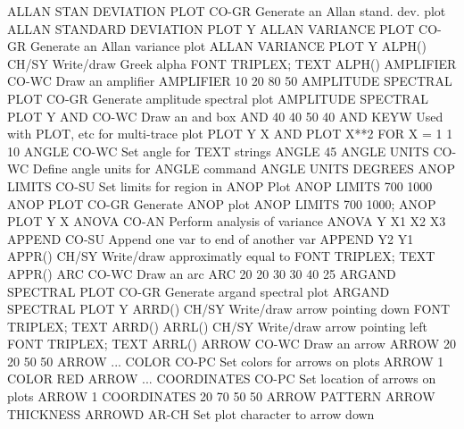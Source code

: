 ALLAN STAN DEVIATION PLOT   CO-GR Generate an Allan stand. dev. plot
                                  ALLAN STANDARD DEVIATION PLOT Y
ALLAN VARIANCE PLOT         CO-GR Generate an Allan variance plot
                                  ALLAN VARIANCE PLOT Y
ALPH()                      CH/SY Write/draw Greek alpha
                                  FONT TRIPLEX; TEXT ALPH()
AMPLIFIER                   CO-WC Draw an amplifier
                                  AMPLIFIER 10 20 80 50
AMPLITUDE SPECTRAL PLOT     CO-GR Generate amplitude spectral plot
                                  AMPLITUDE SPECTRAL PLOT Y
AND                         CO-WC Draw an and box
                                  AND 40 40 50 40
AND                         KEYW  Used with PLOT, etc for multi-trace plot
                                  PLOT Y X AND
                                  PLOT X**2 FOR X = 1 1 10
ANGLE                       CO-WC Set angle for TEXT strings
                                  ANGLE 45
ANGLE UNITS                 CO-WC Define angle units for ANGLE command
                                  ANGLE UNITS DEGREES
ANOP LIMITS                 CO-SU Set limits for region in ANOP Plot
                                  ANOP LIMITS 700 1000
ANOP PLOT                   CO-GR Generate ANOP plot
                                  ANOP LIMITS 700 1000; ANOP PLOT Y X
ANOVA                       CO-AN Perform analysis of variance
                                  ANOVA Y X1 X2 X3
APPEND                      CO-SU Append one var to end of another var
                                  APPEND Y2 Y1
APPR()                      CH/SY Write/draw approximatly equal to
                                  FONT TRIPLEX; TEXT APPR()
ARC                         CO-WC Draw an arc
                                  ARC 20 20 30 30 40 25
ARGAND SPECTRAL PLOT        CO-GR Generate argand spectral plot
                                  ARGAND SPECTRAL PLOT Y
ARRD()                      CH/SY Write/draw arrow pointing down
                                  FONT TRIPLEX; TEXT ARRD()
ARRL()                      CH/SY Write/draw arrow pointing left
                                  FONT TRIPLEX; TEXT ARRL()
ARROW                       CO-WC Draw an arrow
                                  ARROW 20 20 50 50
ARROW ... COLOR             CO-PC Set colors for arrows on plots
                                  ARROW 1 COLOR RED
ARROW ... COORDINATES       CO-PC Set location of arrows on plots
                                  ARROW 1 COORDINATES 20 70 50 50
ARROW PATTERN
ARROW THICKNESS
ARROWD                      AR-CH Set plot character to arrow down

